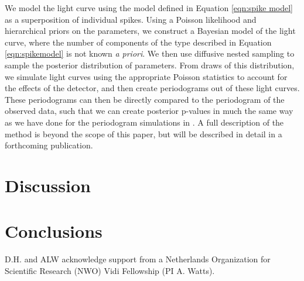 \documentclass[numberedappendix]{emulateapj}
\begin{document}
We model the light curve using the model defined in Equation \ref{eqn:spike model} as a superposition of individual spikes. Using a Poisson likelihood and hierarchical priors on the parameters, we construct a Bayesian model of the light curve, where the number of components of the type described in Equation \ref{eqn:spikemodel} is not known {\it a priori}. We then use diffusive nested sampling \citep{brewer2011} to sample the posterior distribution of parameters. From draws of this distribution, we simulate light curves using the appropriate Poisson statistics to account for the effects of the detector, and then create periodograms out of these light curves. These periodograms can then be directly compared to the periodogram of the observed data, such that we can create posterior p-values in much the same way as we have done for the periodogram simulations in \citep{huppenkothen13}. A full description of the method is beyond the scope of this paper, but will be described in detail in a forthcoming publication. 



\section{Discussion}
\label{sec:discussion}

\section{Conclusions}


\acknowledgments
D.H. and ALW acknowledge support from a Netherlands Organization for Scientific Research (NWO) Vidi Fellowship (PI A. Watts).  




\end{document}
